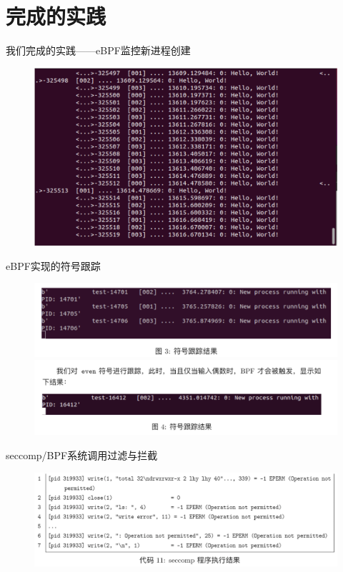 \documentclass[UTF8,fontset=macnew,xcolor=table]{ctexbeamer}
\begin{document}
\section{完成的实践}

\begin{frame}{我们完成的实践——eBPF监控新进程创建}
    \begin{figure}[H]
        \centering
        \includegraphics[width=0.68\columnwidth]{pic5.png}
    \end{figure}
\end{frame}

\begin{frame}{eBPF实现的符号跟踪}
    \begin{figure}[H]
        \centering
        \includegraphics[width=0.72\columnwidth]{pic6.png}
        \includegraphics[width=0.72\columnwidth]{pic7.png}
    \end{figure}
\end{frame}

\begin{frame}{seccomp/BPF系统调用过滤与拦截}
    \begin{figure}[H]
        \centering
        \includegraphics[width=0.8\columnwidth]{pic8.png}
    \end{figure}
\end{frame}
\end{document}
